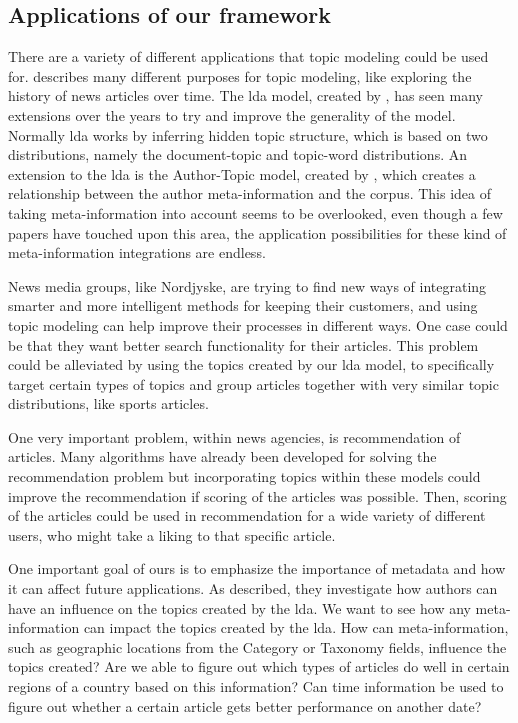 \subsection{Applications of our framework}\label{sec:appendix_applications}
There are a variety of different applications that topic modeling could be used for. 
\citet{Probabilistic_Topic_Models} describes many different purposes for topic modeling, like exploring the history of news articles over time.
The \gls{lda} model, created by \citet{blei2003latent}, has seen many extensions over the years to try and improve the generality of the model.
Normally \gls{lda} works by inferring hidden topic structure, which is based on two distributions, namely the document-topic and topic-word distributions.
An extension to the \gls{lda} is the Author-Topic model, created by \citet{author_topic_2012}, which creates a relationship between the author meta-information and the corpus.
This idea of taking meta-information into account seems to be overlooked, even though a few papers have touched upon this area, the application possibilities for these kind of meta-information integrations are endless.

News media groups, like Nordjyske, are trying to find new ways of integrating smarter and more intelligent methods for keeping their customers, and using topic modeling can help improve their processes in different ways.
One case could be that they want better search functionality for their articles.
This problem could be alleviated by using the topics created by our \gls{lda} model, to specifically target certain types of topics and group articles together with very similar topic distributions, like sports articles.

One very important problem, within news agencies, is recommendation of articles.
Many algorithms have already been developed for solving the recommendation problem but incorporating topics within these models could improve the recommendation if scoring of the articles was possible.
Then, scoring of the articles could be used in recommendation for a wide variety of different users, who might take a liking to that specific article.

One important goal of ours is to emphasize the importance of metadata and how it can affect future applications.
As \citet{author_topic_2012} described, they investigate how authors can have an influence on the topics created by the \gls{lda}.
We want to see how any meta-information can impact the topics created by the \gls{lda}. 
How can meta-information, such as geographic locations from the Category or Taxonomy fields, influence the topics created?
Are we able to figure out which types of articles do well in certain regions of a country based on this information? 
Can time information be used to figure out whether a certain article gets better performance on another date?
